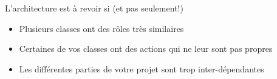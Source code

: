 \begin{frame}
    \begin{block}{L'architecture est à revoir si (et pas seulement!)}
        \begin{itemize}
            \item Plusieurs classes ont des rôles très similaires
            \item Certaines de vos classes ont des actions qui ne leur sont pas propres
            \item Les différentes parties de votre projet sont trop inter-dépendantes
        \end{itemize}
    \end{block}
\end{frame}


